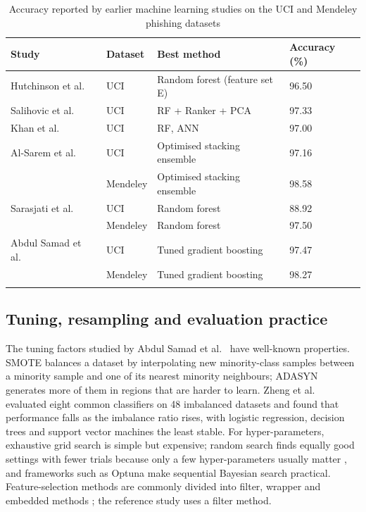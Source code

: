 \documentclass[pdflatex,sn-mathphys-num]{sn-jnl}%
\theoremstyle{thmstyleone}%
\theoremstyle{thmstyletwo}%
\theoremstyle{thmstylethree}%
\begin{document}
\begin{table}[htbp]
\caption{Accuracy reported by earlier machine learning studies on the UCI and Mendeley phishing datasets}\label{tab:prior}%
\begin{tabular}{@{}llll@{}}
\toprule
Study & Dataset & Best method & Accuracy (\%)\\
\midrule
Hutchinson et al.\ \cite{hutchinson2018} & UCI & Random forest (feature set E) & 96.50 \\
Salihovic et al.\ \cite{salihovic2019} & UCI & RF + Ranker + PCA & 97.33 \\
Khan et al.\ \cite{khan2020} & UCI\footnotemark[1] & RF, ANN & 97.00 \\
Al-Sarem et al.\ \cite{alsarem2021} & UCI & Optimised stacking ensemble & 97.16 \\
 & Mendeley\footnotemark[2] & Optimised stacking ensemble & 98.58 \\
Sarasjati et al.\ \cite{sarasjati2022} & UCI & Random forest & 88.92 \\
 & Mendeley & Random forest & 97.50 \\
Abdul Samad et al.\ \cite{abdulsamad2023} & UCI & Tuned gradient boosting & 97.47 \\
 & Mendeley & Tuned gradient boosting & 98.27 \\
\botrule
\end{tabular}
\end{table}

\subsection{Tuning, resampling and evaluation practice}\label{subsec2-3}

The tuning factors studied by Abdul Samad et al.\ \cite{abdulsamad2023} have well-known properties. SMOTE \cite{chawla2002} balances a dataset by interpolating new minority-class samples between a minority sample and one of its nearest minority neighbours; ADASYN \cite{he2008} generates more of them in regions that are harder to learn. Zheng et al.\ \cite{zheng2022} evaluated eight common classifiers on 48 imbalanced datasets and found that performance falls as the imbalance ratio rises, with logistic regression, decision trees and support vector machines the least stable. For hyper-parameters, exhaustive grid search is simple but expensive; random search finds equally good settings with fewer trials because only a few hyper-parameters usually matter \cite{bergstra2012}, and frameworks such as Optuna \cite{akiba2019} make sequential Bayesian search practical. Feature-selection methods are commonly divided into filter, wrapper and embedded methods \cite{guyon2003}; the reference study uses a filter method.
\end{document}
